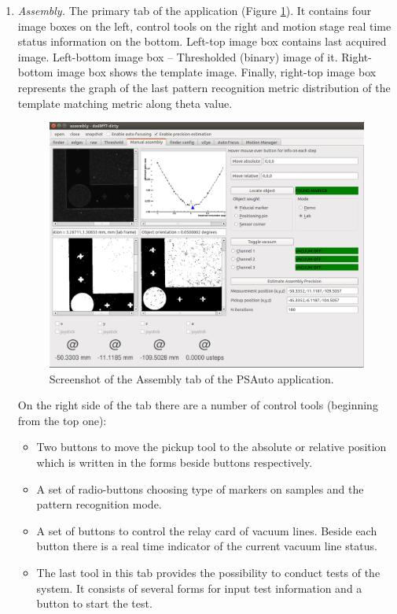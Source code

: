 \begin{enumerate}
\item \emph{Assembly.} The primary tab of the application (Figure \ref{fig:assembly_screenshot}). It contains four image boxes on the left, control tools on the right and motion stage real time status information on the bottom. Left-top image box contains last acquired image. Left-bottom image box -- Thresholded (binary) image of it. Right-bottom image box shows the template image. Finally, right-top image box represents the graph of the last pattern recognition metric distribution of the template matching metric along theta value.

\begin{figure}[ht]\centering
\includegraphics[width=0.7\linewidth]{Data/Control_Software/Assembly_screenshot.png}
\caption{Screenshot of the Assembly tab of the PSAuto application.}
\label{fig:assembly_screenshot}
\end{figure}

On the right side of the tab there are a number of control tools (beginning from the top one):

\begin{itemize}
\setlength\itemsep{-0.5em}
\item Two buttons to move the pickup tool to the absolute or relative position which is written in the forms beside buttons respectively.
\item A set of radio-buttons choosing type of markers on samples and the pattern recognition mode.
\item A set of buttons to control the relay card of vacuum lines. Beside each button there is a real time indicator of the current vacuum line status.
\item The last tool in this tab provides the possibility to conduct tests of the system. It consists of several forms for input test information and a button to start the test.
\end{itemize}


\end{enumerate}

